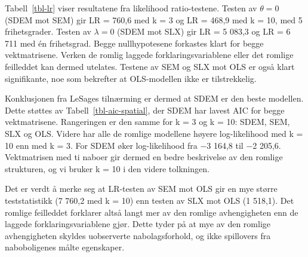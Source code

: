 \documentclass[
  norsk,
  a4paper,
]{article}
\begin{document}
Tabell~\ref{tbl-lr} viser resultatene fra likelihood ratio-testene.
Testen av \(\theta = 0\) (SDEM mot SEM) gir LR = 760,6 med k = 3 og LR =
468,9 med k = 10, med 5 frihetsgrader. Testen av \(\lambda = 0\) (SDEM
mot SLX) gir LR = 5 083,3 og LR = 6 711 med én frihetsgrad. Begge
nullhypotesene forkastes klart for begge vektmatrisene. Verken de romlig
laggede forklaringsvariablene eller det romlige feilleddet kan dermed
utelates. Testene av SEM og SLX mot OLS er også klart signifikante, noe
som bekrefter at OLS-modellen ikke er tilstrekkelig.

Konklusjonen fra LeSages tilnærming er dermed at SDEM er den beste
modellen. Dette støttes av Tabell~\ref{tbl-aic-spatial}, der SDEM har
lavest AIC for begge vektmatrisene. Rangeringen er den samme for k = 3
og k = 10: SDEM, SEM, SLX og OLS. Videre har alle de romlige modellene
høyere log-likelihood med k = 10 enn med k = 3. For SDEM øker
log-likelihood fra −3 164,8 til −2 205,6. Vektmatrisen med ti naboer gir
dermed en bedre beskrivelse av den romlige strukturen, og vi bruker k =
10 i den videre tolkningen.

Det er verdt å merke seg at LR-testen av SEM mot OLS gir en mye større
teststatistikk (7 760,2 med k = 10) enn testen av SLX mot OLS (1 518,1).
Det romlige feilleddet forklarer altså langt mer av den romlige
avhengigheten enn de laggede forklaringsvariablene gjør. Dette tyder på
at mye av den romlige avhengigheten skyldes uobserverte nabolagsforhold,
og ikke spillovers fra naboboligenes målte egenskaper.
\end{document}
